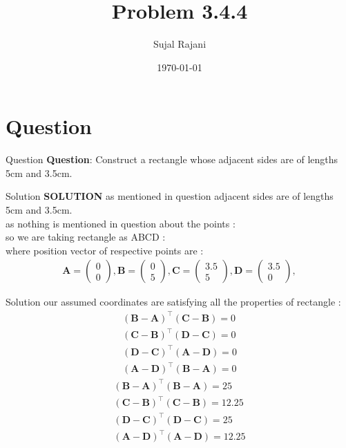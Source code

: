 \documentclass{beamer}
\title{Problem 3.4.4}
\author{Sujal Rajani}
\date{\today}
\let\vec\mathbf
\theoremstyle{remark}
\newcommand{\myvec}[1]{\ensuremath{\begin{pmatrix}#1\end{pmatrix}}}
\numberwithin{equation}{section}
\begin{document}
\begin{frame}
\titlepage
\end{frame}

\section{Question}
\begin{frame}{Question}
\textbf{Question}:
\noindent Construct a rectangle whose adjacent sides are of lengths 5cm and 3.5cm.
\end{frame}
\begin{frame}{Solution}
\textbf{SOLUTION}
 as  mentioned in question adjacent sides are of lengths 5cm and 3.5cm.
 \\
as nothing is mentioned in question about the points :
\\
so we are taking rectangle as ABCD :
\\
 where position vector of respective points are :
 \\
 \begin{align*}
     \vec{A}=\myvec{0\\0}, \vec{B}=\myvec{0\\5}, \vec{C}=\myvec{3.5\\5},\vec{D}=\myvec{3.5\\0},
 \end{align*}
 \end{frame}
\begin{frame}{Solution}
 our assumed coordinates are satisfying all the properties of rectangle :
 \begin{align*}
     (\vec{B}-\vec{A})^\top(\vec{C}-\vec{B})=0
     \\
      (\vec{C}-\vec{B})^\top(\vec{D}-\vec{C})=0
      \\
       (\vec{D}-\vec{C})^\top(\vec{A}-\vec{D})=0
        \\
        (\vec{A}-\vec{D})^\top(\vec{B}-\vec{A})=0
 \end{align*}
 \begin{align*}
     (\vec{B}-\vec{A})^\top(\vec{B}-\vec{A})=25
     \\
     (\vec{C}-\vec{B})^\top(\vec{C}-\vec{B})=12.25
     \\
      (\vec{D}-\vec{C})^\top (\vec{D}-\vec{C})=25
      \\
      (\vec{A}-\vec{D})^\top(\vec{A}-\vec{D})=12.25
 \end{align*}
     \end{frame}
\end{document}
